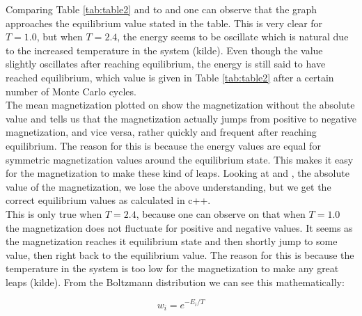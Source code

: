 \documentclass[10pt,a4paper]{article}
\begin{document}
\noindent Comparing Table \ref{tab:table2} and to  and  one can observe that the graph approaches the equilibrium value stated in the table. This is very clear for $T = 1.0$, but when $T = 2.4$, the energy seems to be oscillate which is natural due to the increased temperature in the system (kilde). Even though the value slightly oscillates after reaching equilibrium, the energy is still said to have reached equilibrium, which value is given in Table \ref{tab:table2} after a certain number of Monte Carlo cycles.
\\
The mean magnetization plotted on  show the magnetization without the absolute value and tells us that the magnetization actually jumps from positive to negative magnetization, and vice versa, rather quickly and frequent after reaching equilibrium. The reason for this is because the energy values are equal for symmetric magnetization values around the equilibrium state. This makes it easy for the magnetization to make these kind of leaps. Looking at  and , the absolute value of the magnetization, we lose the above understanding, but we get the correct equilibrium values as calculated in c++.
\\
This is only true when $T = 2.4$, because one can observe on  that when $T = 1.0$ the magnetization does not fluctuate for positive and negative values. It seems as the magnetization reaches it equilibrium state and then shortly jump to some value, then right back to the equilibrium value. The reason for this is because the temperature in the system is too low for the magnetization to make any great leaps (kilde). From the Boltzmann distribution we can see this mathematically:

$$
w_i = e^{-E_i/T}
$$
\end{document}
